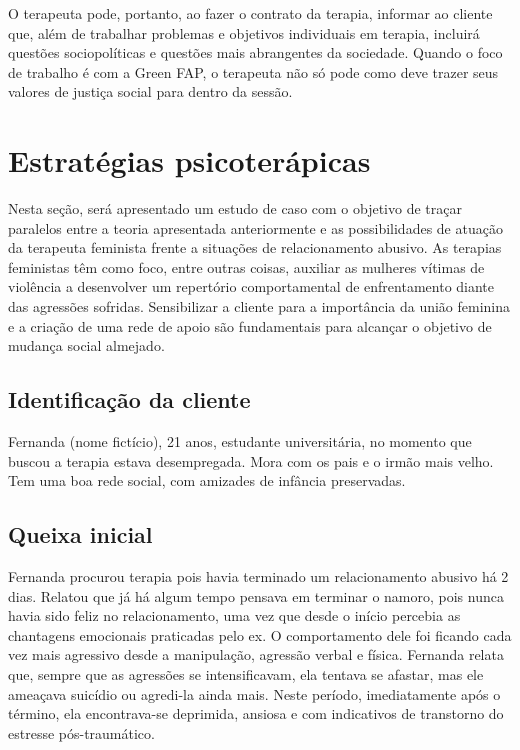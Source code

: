 O terapeuta pode, portanto, ao fazer o contrato da terapia, informar ao cliente que, além de trabalhar problemas e objetivos individuais em terapia, incluirá questões sociopolíticas e questões mais abrangentes da sociedade. Quando o foco de trabalho é com a Green FAP, o terapeuta não só pode como deve trazer seus valores de justiça social para dentro da sessão.

\section{Estratégias psicoterápicas}

Nesta seção, será apresentado um estudo de caso com o objetivo de traçar paralelos entre a teoria apresentada anteriormente e as possibilidades de atuação da terapeuta feminista frente a situações de relacionamento abusivo. As terapias feministas têm como foco, entre outras coisas, auxiliar as mulheres vítimas de violência a desenvolver um repertório comportamental de enfrentamento diante das agressões sofridas. Sensibilizar a cliente para a importância da união feminina e a criação de uma rede de apoio são fundamentais para alcançar o objetivo de mudança social almejado.

\subsection{Identificação da cliente}

Fernanda (nome fictício), 21 anos, estudante universitária, no momento que buscou a terapia estava desempregada. Mora com os pais e o irmão mais velho. Tem uma boa rede social, com amizades de infância preservadas. 

\subsection{Queixa inicial}

Fernanda procurou terapia pois havia terminado um relacionamento abusivo há 2 dias. Relatou que já há algum tempo pensava em terminar o namoro, pois nunca havia sido feliz no relacionamento, uma vez que desde o início percebia as chantagens emocionais praticadas pelo ex. O comportamento dele foi ficando cada vez mais agressivo desde a manipulação, agressão verbal e física. Fernanda relata que, sempre que as agressões se intensificavam, ela tentava se afastar, mas ele ameaçava suicídio ou agredi-la ainda mais. Neste período, imediatamente após o término, ela encontrava-se deprimida, ansiosa e com indicativos de transtorno do estresse pós-traumático. 

